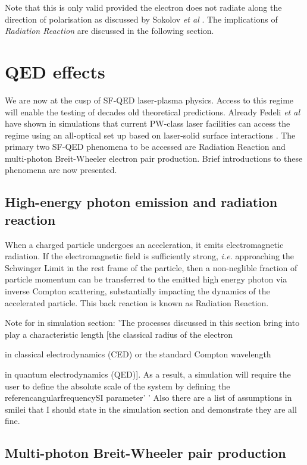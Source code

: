 Note that this is only valid provided the electron does not radiate along the direction of polarisation as discussed by Sokolov \textit{et al} \cite{sokolovDynamicsEmittingElectrons2009}. The implications of \textit{Radiation Reaction }are discussed in the following section.

\section{QED effects}
We are now at the cusp of \ac{SF-QED} laser-plasma physics. Access to this regime will enable the testing of decades old theoretical predictions. Already Fedeli \textit{et al} have shown in simulations that current PW-class laser facilities can access the regime using an all-optical set up based on laser-solid surface interactions \cite{fedeliProbingStrongfieldQED2020}. The primary two SF-QED phenomena to be accessed are Radiation Reaction and multi-photon Breit-Wheeler electron pair production. Brief introductions to these phenomena are now presented.


\subsection{High-energy photon emission and radiation reaction}
When a charged particle undergoes an acceleration, it emits electromagnetic radiation. If the electromagnetic field is sufficiently strong, \textit{i.e.} approaching the Schwinger Limit in the rest frame of the particle, then a non-neglible fraction of particle momentum can be transferred to the emitted high energy photon via inverse Compton scattering, substantially impacting the dynamics of the accelerated particle. This back reaction is known as Radiation Reaction.



Note for in simulation section: 'The processes discussed in this section bring into play a characteristic length [the classical radius of the electron 

in classical electrodynamics (CED) or the standard Compton wavelength 

in quantum electrodynamics (QED)]. As a result, a simulation will require the user to define the absolute scale of the system by defining the referencangularfrequencySI parameter' '
Also there are a list of assumptions in smilei that I should state in the simulation section and demonstrate they are all fine.

\subsection{Multi-photon Breit-Wheeler pair production}

